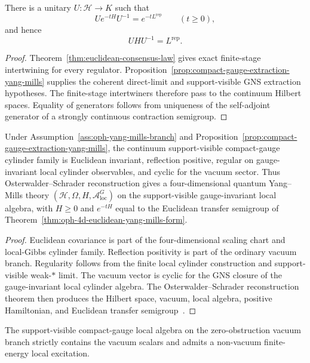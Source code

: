 \begin{theorem}
\label{thm:continuum-transfer-identification}
There is a unitary \(U:\mathcal H\to K\) such that
\[
U e^{-tH}U^{-1}=e^{-tL^{\mathrm{rep}}}\qquad(t\ge 0),
\]
and hence
\[
UHU^{-1}=L^{\mathrm{rep}}.
\]
\end{theorem}

\begin{proof}
Theorem~\ref{thm:euclidean-consensus-law} gives exact finite-stage intertwining for every
regulator. Proposition~\ref{prop:compact-gauge-extraction-yang-mills} supplies the coherent
direct-limit and support-visible GNS extraction hypotheses. The finite-stage intertwiners
therefore pass to the continuum Hilbert spaces. Equality of generators follows from uniqueness of
the self-adjoint generator of a strongly continuous contraction semigroup.
\end{proof}

\begin{theorem}
\label{thm:compact-gauge-os-reconstruction}
Under Assumption~\ref{ass:oph-yang-mills-branch} and
Proposition~\ref{prop:compact-gauge-extraction-yang-mills}, the continuum support-visible
compact-gauge cylinder family is Euclidean invariant, reflection positive, regular on
gauge-invariant local cylinder observables, and cyclic for the vacuum sector. Thus
Osterwalder--Schrader reconstruction gives a four-dimensional quantum Yang--Mills theory
\((\mathcal H,\Omega,H,\mathcal A_{\mathrm{loc}}^G)\) on the support-visible gauge-invariant local
algebra, with \(H\ge0\) and \(e^{-tH}\) equal to the Euclidean transfer semigroup of
Theorem~\ref{thm:oph-4d-euclidean-yang-mills-form}.
\end{theorem}

\begin{proof}
Euclidean covariance is part of the four-dimensional scaling chart and local-Gibbs cylinder
family. Reflection positivity is part of the ordinary vacuum branch. Regularity follows from the
finite local cylinder construction and support-visible weak-\(*\) limit. The vacuum vector is
cyclic for the GNS closure of the gauge-invariant local cylinder algebra. The
Osterwalder--Schrader reconstruction theorem then produces the Hilbert space, vacuum, local
algebra, positive Hamiltonian, and Euclidean transfer semigroup~\cite{osterwalderSchrader73,
osterwalderSchrader75}.
\end{proof}

\begin{proposition}
\label{prop:compact-gauge-nontriviality-yang-mills}
The support-visible compact-gauge local algebra on the zero-obstruction vacuum branch strictly
contains the vacuum scalars and admits a non-vacuum finite-energy local excitation.
\end{proposition}

